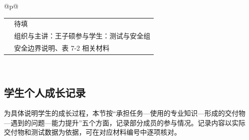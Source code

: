 \begin{longtable}{@{}p{\linewidth}@{}}
\begin{minipage}{\linewidth}
\begin{tabular}{@{}>{\raggedright\arraybackslash}p{}>{\raggedright\arraybackslash}p{}@{}}
\hline
\rowcolor{WordTableHeader}\multicolumn{2}{@{}p{\linewidth}@{}}{\RecordHeading{编号：T-08\quad 活动主题：隔离与数据安全：多租户状态共享的安全边界}} \\ \hline
\rowcolor{white} \TableHeaderText{时间} & 待填 \\ \hline
\rowcolor{white} \TableHeaderText{组织与参与} & 组织与主讲：王子硕\newline 参与学生：测试与安全组 \\ \hline
\rowcolor{white} \TableHeaderText{形成材料} & 安全边界说明、表 7-2 相关材料 \\ \hline
\end{tabular}
\end{minipage} \\[6pt]
\end{longtable}\endgroup
\par{}

\subsection{学生个人成长记录}\label{sec:2.8.3}
为具体说明学生的成长过程，本节按“承担任务---使用的专业知识---形成的交付物---遇到的问题---能力提升”五个方面，记录部分成员的参与情况。记录内容以实际交付物和测试数据为依据，可在对应材料编号中逐项核对。

